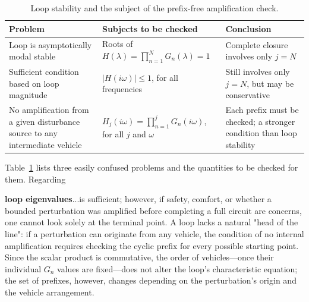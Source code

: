 \documentclass[11pt,a4paper,openany]{book}
\numberwithin{equation}{chapter}
\numberwithin{figure}{chapter}
\numberwithin{table}{chapter}
\begin{document}
\begin{table}[htbp]
\centering
\small
\caption{Loop stability and the subject of the prefix-free amplification check.}
\label{tab:ring-versus-prefix}
\begin{tabular}{p{3.5cm}p{5.0cm}p{5.2cm}}
\toprule
\textbf{Problem} & \textbf{Subjects to be checked} & \textbf{Conclusion} \\
\midrule







Loop is asymptotically modal stable




&




Roots of $H(\lambda)=\prod_{n=1}^{N}G_n(\lambda)=1$




&




Complete closure involves only $j=N$




\\[4pt]
Sufficient condition based on loop magnitude

&

$|H(i\omega)|\le1$, for all frequencies

&

Still involves only $j=N$, but may be conservative
\\[4pt]
No amplification from a given disturbance source to any intermediate vehicle

&

$H_j(i\omega)=\prod_{n=1}^{j}G_n(i\omega)$, for all $j$ and $\omega$

&

Each prefix must be checked; a stronger condition than loop stability
\\
\bottomrule
\end{tabular}
\end{table}



Table~\ref{tab:ring-versus-prefix} lists three easily confused problems and the quantities to be checked for them. Regarding

\textbf{loop eigenvalues}...is sufficient; however, if safety, comfort, or whether a bounded perturbation was amplified before completing a full circuit are concerns, one cannot look solely at the terminal point. A loop lacks a natural "head of the line": if a perturbation can originate from any vehicle, the condition of no internal amplification requires checking the cyclic prefix for every possible starting point. Since the scalar product is commutative, the order of vehicles—once their individual $G_n$ values are fixed—does not alter the loop's characteristic equation; the set of prefixes, however, changes depending on the perturbation's origin and the vehicle arrangement.
\end{document}
